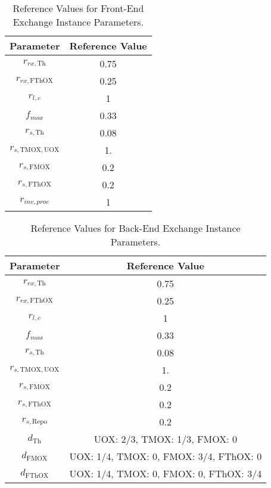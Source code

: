 \begin{table}[h!]
\centering
\caption{Reference Values for Front-End Exchange Instance Parameters.}
\label{tbl:front_ref_params}
\begin{tabular}{|c|c|}
\hline
Parameter    & Reference Value
\\ \hline
$r_{rx, \text{Th}}$   & 0.75 
\\ \hline
$r_{rx, \text{FThOX}}$ & 0.25
\\ \hline
$r_{l, c}$ & 1
\\ \hline
$f_{mox}$     & 0.33
\\ \hline
$r_{s, \text{Th}}$ & 0.08
\\ \hline
$r_{s, \text{TMOX}, \text{UOX}}$ & 1.
\\ \hline
$r_{s, \text{FMOX}}$ & 0.2
\\ \hline
$r_{s, \text{FThOX}}$ & 0.2
\\ \hline
$r_{inv, proc}$   & 1
\\ \hline
\end{tabular}
\end{table}

\begin{table}[h!]
\centering
\caption{Reference Values for Back-End Exchange Instance Parameters.}
\label{tbl:back_ref_params}
\begin{tabular}{|c|c|}
\hline
Parameter    & Reference Value
\\ \hline
$r_{rx, \text{Th}}$   & 0.75 
\\ \hline
$r_{rx, \text{FThOX}}$ & 0.25
\\ \hline
$r_{l, c}$ & 1
\\ \hline
$f_{mox}$     & 0.33
\\ \hline
$r_{s, \text{Th}}$ & 0.08
\\ \hline
$r_{s, \text{TMOX}, \text{UOX}}$ & 1.
\\ \hline
$r_{s, \text{FMOX}}$ & 0.2
\\ \hline
$r_{s, \text{FThOX}}$ & 0.2
\\ \hline
$r_{s, \text{Repo}}$   & 0.2
\\ \hline
$d_{\text{Th}}$   & {UOX: 2/3, TMOX: 1/3, FMOX: 0}
\\ \hline
$d_{\text{FMOX}}$   & {UOX: 1/4, TMOX: 0, FMOX: 3/4, FThOX: 0}
\\ \hline
$d_{\text{FThOX}}$   & {UOX: 1/4, TMOX: 0, FMOX: 0, FThOX: 3/4}
\\ \hline
\end{tabular}
\end{table}

